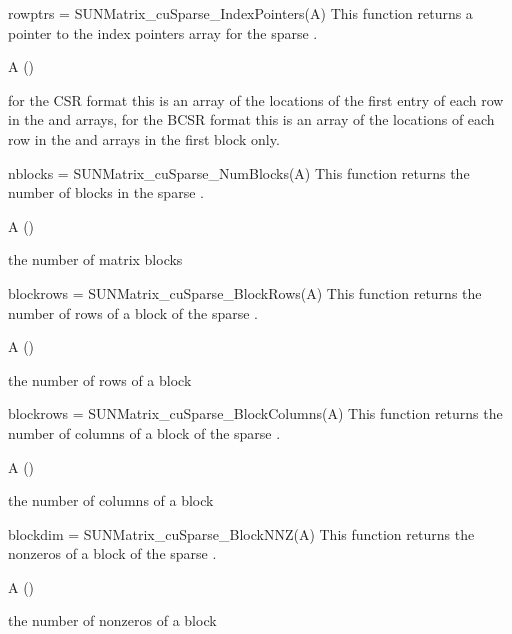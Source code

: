 {
  rowptrs = SUNMatrix\_cuSparse\_IndexPointers(A)
}
{
  This function returns a pointer to the index pointers array for the
  sparse .
}
{
  \begin{args}
  \item[A] ()
  \end{args}
}
{
  for the CSR format this is an array of the locations
  of the first entry of each row in the  and  arrays,
  for the BCSR format this is an array of the locations of each row in the
   and  arrays in the first block only.
}
{
}

{
  nblocks = SUNMatrix\_cuSparse\_NumBlocks(A)
}
{
  This function returns the number of blocks in the sparse .
}
{
  \begin{args}
  \item[A] ()
  \end{args}
}
{
  the number of matrix blocks
}
{
}


{
  blockrows = SUNMatrix\_cuSparse\_BlockRows(A)
}
{
  This function returns the number of rows of a
  block of the sparse .
}
{
  \begin{args}
  \item[A] ()
  \end{args}
}
{
  the number of rows of a block
}
{
}


{
  blockrows = SUNMatrix\_cuSparse\_BlockColumns(A)
}
{
  This function returns the number of columns of a
  block of the sparse .
}
{
  \begin{args}
  \item[A] ()
  \end{args}
}
{
  the number of columns of a block
}
{
}


{
  blockdim = SUNMatrix\_cuSparse\_BlockNNZ(A)
}
{
  This function returns the nonzeros of a block of the sparse .
}
{
  \begin{args}
  \item[A] ()
  \end{args}
}
{
  the number of nonzeros of a block
}
{
}


